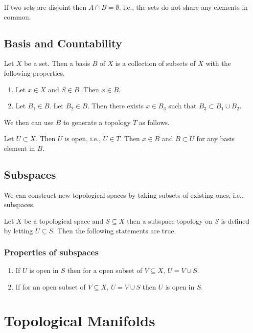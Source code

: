 \documentclass{article}
\begin{document}
If two sets are disjoint then $ A \cap B = \emptyset $, i.e., the sets do not share any elements in common.
\subsection{Basis and Countability}

Let $ X $ be a set. Then a basis $ B $ of $ X $ is a collection of subsets of $ X $ with the following
properties.

\begin{enumerate}
\item Let $ x \in X $ and $ S \in B $. Then $ x \in B $.
\item Let $ B_{1} \in B $. Let $ B_{2} \in B $. Then there exists  $ x \in B_{3} $ such that $ B_{3} \subset B_{1} \cup B_{2} $.
\end{enumerate}

We then can use $ B $ to generate a topology $ T $ as follows.

Let $ U \subset X $. Then $ U $ is open, i.e., $ U \in T $. Then  $ x \in B $ and $ B \subset U $ for any basis element in $ B $.

\subsection{Subspaces}

We can construct new topological spaces by taking subsets of existing ones, i.e., subspaces.

Let $ X $ be a topological space and $ S \subseteq X $ then a subspace topology on $ S $ is defined
by letting  $ U \subseteq  S $. Then the following statements are true.
\subsubsection{Properties of subspaces}

\begin{enumerate}
\item If $ U $ is open in $ S $ then for a open subset of $ V \subseteq X $, $ U =  V \cup  S $.
\item If for an open subset of $ V \subseteq X $, $ U =  V \cup  S $ then  $ U $ is open in $ S $.
\end{enumerate}

\section{Topological Manifolds}
\end{document}
